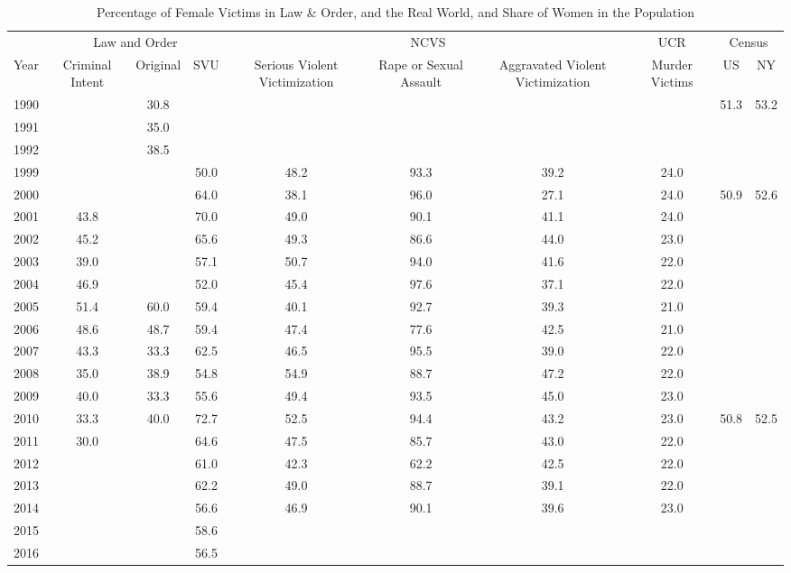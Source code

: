 \begin{table}[!htb]
\centering
\caption{Percentage of Female Victims in Law \& Order, and the Real World, and Share of Women in the Population} 
\label{tab:v_sex}
\begingroup\tiny
\begin{tabular}{cccccccccc}
  \toprule
   & \multicolumn{3}{c}{{Law and Order}} & \multicolumn{3}{c}{{NCVS}} & \multicolumn{1}{c}{{UCR}} & \multicolumn{2}{c}{{Census}}\\
 \cmidrule(lr){2-4}\cmidrule(lr){5-7}\cmidrule(lr){9-10}
 {Year} & {Criminal Intent} & {Original} & {SVU} & {Serious Violent Victimization} & {Rape or Sexual Assault} & {Aggravated Violent Victimization} & {Murder Victims} & {US} & {NY}\\
 \midrule
1990 &  & 30.8 &  &  &  &  &  & 51.3 & 53.2 \\ 
  1991 &  & 35.0 &  &  &  &  &  &  &  \\ 
  1992 &  & 38.5 &  &  &  &  &  &  &  \\ 
  1999 &  &  & 50.0 & 48.2 & 93.3 & 39.2 & 24.0 &  &  \\ 
  2000 &  &  & 64.0 & 38.1 & 96.0 & 27.1 & 24.0 & 50.9 & 52.6 \\ 
  2001 & 43.8 &  & 70.0 & 49.0 & 90.1 & 41.1 & 24.0 &  &  \\ 
  2002 & 45.2 &  & 65.6 & 49.3 & 86.6 & 44.0 & 23.0 &  &  \\ 
  2003 & 39.0 &  & 57.1 & 50.7 & 94.0 & 41.6 & 22.0 &  &  \\ 
  2004 & 46.9 &  & 52.0 & 45.4 & 97.6 & 37.1 & 22.0 &  &  \\ 
  2005 & 51.4 & 60.0 & 59.4 & 40.1 & 92.7 & 39.3 & 21.0 &  &  \\ 
  2006 & 48.6 & 48.7 & 59.4 & 47.4 & 77.6 & 42.5 & 21.0 &  &  \\ 
  2007 & 43.3 & 33.3 & 62.5 & 46.5 & 95.5 & 39.0 & 22.0 &  &  \\ 
  2008 & 35.0 & 38.9 & 54.8 & 54.9 & 88.7 & 47.2 & 22.0 &  &  \\ 
  2009 & 40.0 & 33.3 & 55.6 & 49.4 & 93.5 & 45.0 & 23.0 &  &  \\ 
  2010 & 33.3 & 40.0 & 72.7 & 52.5 & 94.4 & 43.2 & 23.0 & 50.8 & 52.5 \\ 
  2011 & 30.0 &  & 64.6 & 47.5 & 85.7 & 43.0 & 22.0 &  &  \\ 
  2012 &  &  & 61.0 & 42.3 & 62.2 & 42.5 & 22.0 &  &  \\ 
  2013 &  &  & 62.2 & 49.0 & 88.7 & 39.1 & 22.0 &  &  \\ 
  2014 &  &  & 56.6 & 46.9 & 90.1 & 39.6 & 23.0 &  &  \\ 
  2015 &  &  & 58.6 &  &  &  &  &  &  \\ 
  2016 &  &  & 56.5 &  &  &  &  &  &  \\ 
   \bottomrule
\end{tabular}
\endgroup
\end{table}
